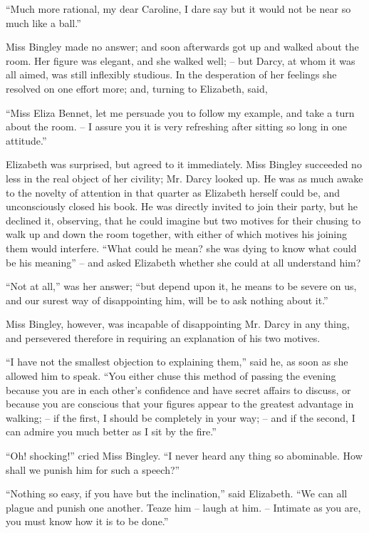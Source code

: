 “Much more rational, my dear Caroline, I dare say
but it would not be near so much like a ball.”

Miss Bingley made no answer; and soon afterwards
got up and walked about the room. Her figure was
elegant, and she walked well; -- but Darcy, at whom it
was all aimed, was still inflexibly studious. In the desperation
of her feelings she resolved on one effort more; and,
turning to Elizabeth, said,

“Miss Eliza Bennet, let me persuade you to follow my
example, and take a turn about the room. -- I assure you
it is very refreshing after sitting so long in one attitude.”

Elizabeth was surprised, but agreed to it immediately.
Miss Bingley succeeded no less in the real object of her
civility; Mr. Darcy looked up. He was as much awake
to the novelty of attention in that quarter as Elizabeth
herself could be, and unconsciously closed his book. He
was directly invited to join their party, but he declined
it, observing, that he could imagine but two motives for
their chusing to walk up and down the room together,
with either of which motives his joining them would
interfere. “What could he mean? she was dying to
know what could be his meaning” -- and asked Elizabeth
whether she could at all understand him?

“Not at all,” was her answer; “but depend upon it,
he means to be severe on us, and our surest way of disappointing
him, will be to ask nothing about it.”

Miss Bingley, however, was incapable of disappointing
Mr. Darcy in any thing, and persevered therefore in
requiring an explanation of his two motives.

“I have not the smallest objection to explaining them,”
said he, as soon as she allowed him to speak. “You
either chuse this method of passing the evening because
you are in each other’s confidence and have secret affairs
to discuss, or because you are conscious that your figures
appear to the greatest advantage in walking; -- if the first,
I should be completely in your way; -- and if the second,
I can admire you much better as I sit by the fire.”

“Oh! shocking!” cried Miss Bingley. “I never heard
any thing so abominable. How shall we punish him for
such a speech?”

“Nothing so easy, if you have but the inclination,”
said Elizabeth. “We can all plague and punish one
another. Teaze him -- laugh at him. -- Intimate as you
are, you must know how it is to be done.”

